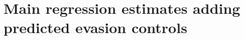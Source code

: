 \documentclass{article}
\begin{document}

\section{Main regression estimates adding predicted evasion controls}
\end{document}
